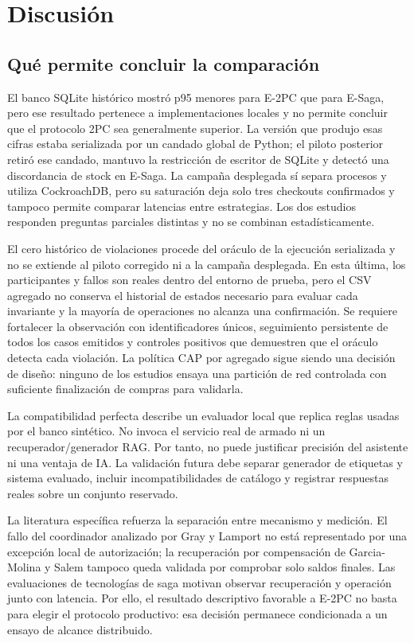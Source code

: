 \documentclass[12pt,a4paper]{article}
\newcommand{\seccion}[1]{\section{#1}}
\begin{document}


\seccion{Discusión}
\subsection{Qué permite concluir la comparación}
El banco SQLite histórico mostró p95 menores para E-2PC que para E-Saga, pero ese resultado pertenece a implementaciones locales y no permite concluir que el protocolo 2PC sea generalmente superior. La versión que produjo esas cifras estaba serializada por un candado global de Python; el piloto posterior retiró ese candado, mantuvo la restricción de escritor de SQLite y detectó una discordancia de stock en E-Saga. La campaña desplegada sí separa procesos y utiliza CockroachDB, pero su saturación deja solo tres checkouts confirmados y tampoco permite comparar latencias entre estrategias. Los dos estudios responden preguntas parciales distintas y no se combinan estadísticamente.

El cero histórico de violaciones procede del oráculo de la ejecución serializada y no se extiende al piloto corregido ni a la campaña desplegada. En esta última, los participantes y fallos son reales dentro del entorno de prueba, pero el CSV agregado no conserva el historial de estados necesario para evaluar cada invariante y la mayoría de operaciones no alcanza una confirmación. Se requiere fortalecer la observación con identificadores únicos, seguimiento persistente de todos los casos emitidos y controles positivos que demuestren que el oráculo detecta cada violación. La política CAP por agregado sigue siendo una decisión de diseño: ninguno de los estudios ensaya una partición de red controlada con suficiente finalización de compras para validarla.

La compatibilidad perfecta describe un evaluador local que replica reglas usadas por el banco sintético. No invoca el servicio real de armado ni un recuperador/generador RAG. Por tanto, no puede justificar precisión del asistente ni una ventaja de IA. La validación futura debe separar generador de etiquetas y sistema evaluado, incluir incompatibilidades de catálogo y registrar respuestas reales sobre un conjunto reservado.

La literatura específica refuerza la separación entre mecanismo y medición. El fallo del coordinador analizado por Gray y Lamport \cite{gray2006commit} no está representado por una excepción local de autorización; la recuperación por compensación de Garcia-Molina y Salem \cite{garciamolina1987sagas} tampoco queda validada por comprobar solo saldos finales. Las evaluaciones de tecnologías de saga \cite{stefanko2019saga,durr2022saga} motivan observar recuperación y operación junto con latencia. Por ello, el resultado descriptivo favorable a E-2PC no basta para elegir el protocolo productivo: esa decisión permanece condicionada a un ensayo de alcance distribuido.
\end{document}
